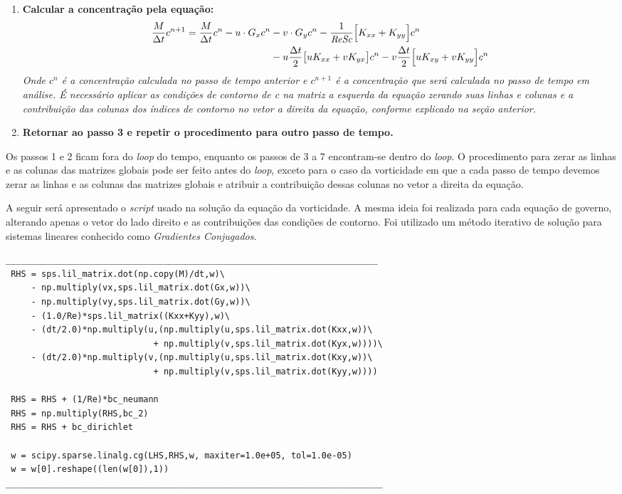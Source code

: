 \begin{enumerate}
 \item \textbf{Calcular a concentração pela equação:}
  \begin{equation}
  \begin{aligned}
   \frac{M}{\Delta t} c^{n+1}
   =  \frac{M}{\Delta t} c^{n}
   - u \cdot G_x c^{n}
   & - v \cdot G_y c^{n} 
   - \frac{1}{\textit{ReSc}} \Big[ K_{xx} + K_{yy} \Big] c^{n}
   \\
   & - u
   \frac{\Delta t}{2}
   \big[
   u K_{xx}
   + v K_{yx}
   \big]
   c^{n} 
   - v
   \frac{\Delta t}{2}
   \Big[
   u K_{xy}
   + v K_{yy}
   \Big]
   c^{n} \notag
  \end{aligned}
  \end{equation}
  \textit{Onde $c^{n}$ é a concentração calculada no passo de tempo anterior 
  e $c^{n+1}$ é a concentração que será calculada no passo de tempo em análise. 
  É necessário aplicar as condições de contorno de c na matriz a esquerda da equação
  zerando suas linhas e colunas e a contribuição das colunas dos índices de contorno 
  no vetor a direita da equação,
  conforme explicado na seção anterior.}


 \item \textbf{Retornar ao passo 3 e repetir o procedimento para outro
 passo de tempo.}
\end{enumerate}

\newpage
\noindent
Os passos 1 e 2 ficam fora do \textit{loop} do tempo, enquanto
os passos de 3 a 7 encontram-se dentro do \textit{loop}.
O procedimento para zerar as linhas e as colunas das matrizes globais
pode ser feito antes do \textit{loop}, exceto para o caso
da vorticidade em que a cada passo de tempo devemos zerar as linhas
e as colunas das matrizes globais e atribuir a contribuição dessas colunas
no vetor a direita da equação.

\medskip
\noindent
A seguir será apresentado o \textit{script} usado na solução da equação da 
vorticidade. A mesma ideia foi realizada para cada equação de governo,
alterando apenas o vetor do lado direito e as contribuições das condições
de contorno. Foi utilizado um método iterativo de solução para sistemas
lineares conhecido como \textit{Gradientes Conjugados}.

\begin{verbatim}
_________________________________________________________________________
 RHS = sps.lil_matrix.dot(np.copy(M)/dt,w)\ 
     - np.multiply(vx,sps.lil_matrix.dot(Gx,w))\
     - np.multiply(vy,sps.lil_matrix.dot(Gy,w))\
     - (1.0/Re)*sps.lil_matrix((Kxx+Kyy),w)\
     - (dt/2.0)*np.multiply(u,(np.multiply(u,sps.lil_matrix.dot(Kxx,w))\ 
                             + np.multiply(v,sps.lil_matrix.dot(Kyx,w))))\
     - (dt/2.0)*np.multiply(v,(np.multiply(u,sps.lil_matrix.dot(Kxy,w))\ 
                             + np.multiply(v,sps.lil_matrix.dot(Kyy,w))))
 
 RHS = RHS + (1/Re)*bc_neumann
 RHS = np.multiply(RHS,bc_2)
 RHS = RHS + bc_dirichlet
 
 w = scipy.sparse.linalg.cg(LHS,RHS,w, maxiter=1.0e+05, tol=1.0e-05)
 w = w[0].reshape((len(w[0]),1))
__________________________________________________________________________
\end{verbatim}

